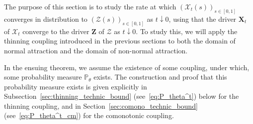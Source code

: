 \documentclass[en,oneside,bbfont,article]{amsart}
\theoremstyle{remark}
\theoremstyle{definition}
\theoremstyle{definition}
\newcommand\X{\bm{\mathcal{X}}}
\newcommand\ZZ{\bm{\mathcal{Z}}}
\newcommand\p{\mathds{P}}
\newcommand\1{\mathds{1}}
\newcommand\da{\downarrow}
\begin{document}
The purpose of this section is to study the rate at which $(\X_t(s))_{s \in [0,1]}$ converges in distribution to $(\ZZ(s))_{s \in [0,1]}$ as $t \da 0$, using that the driver $\bm{X}_t$ of $\X_t$ converge to the driver $\bm{Z}$ of $\ZZ$ as $t \da 0$. To study this, we will apply the thinning coupling introduced in the previous sections to both the domain of normal attraction and the domain of non-normal attraction. 

In the ensuing theorem, we assume the existence of some coupling, under which, some probability measure $\p_\theta$ exists. The construction and proof that this probability measure exists is given explicitly in Subsection~\ref{sec:thinning_technic_bound} (see~\eqref{eq:P_theta^t}) below for the thinning coupling, and in Section~\ref{sec:comono_technic_bound} (see~\eqref{eq:P_theta^t_cm}) for the comonotonic coupling. 
\end{document}

